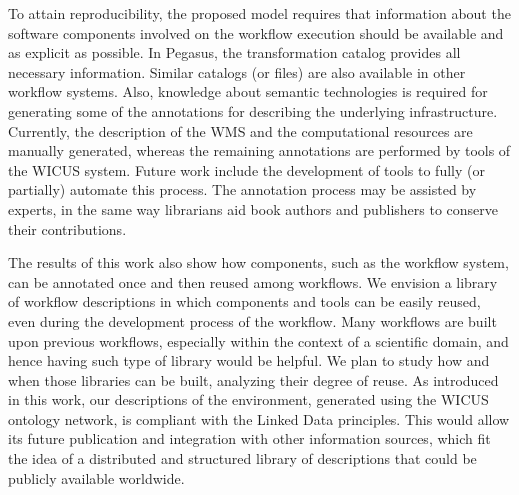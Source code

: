 
To attain reproducibility, the proposed model requires that information about
the software components involved on the workflow execution should be available
and as explicit as possible. In Pegasus, the transformation catalog provides 
all necessary information. Similar catalogs (or files) are also available in other
workflow systems. 
Also, knowledge about semantic technologies is required for generating 
some of the annotations for describing the underlying infrastructure. Currently,
the description of the WMS and the computational resources are manually 
generated, whereas the remaining annotations are performed by tools of the 
WICUS system. Future work include the development of tools to fully (or 
partially) automate this process. The annotation process may be assisted 
by experts, in the same way librarians aid book authors and publishers to 
conserve their contributions.

The results of this work also show how components, such as the workflow 
system, can be annotated once and then reused among workflows. We 
envision a library of workflow descriptions in which components and tools 
can be easily reused, even during the development process of the workflow. 
Many workflows are built upon previous workflows, especially within the 
context of a scientific domain, and hence having such type of library would 
be helpful. We plan to study how and when those libraries can be built, 
analyzing their degree of reuse. As introduced in this work, our 
descriptions of the environment, generated using the WICUS ontology 
network, is compliant with the Linked Data principles. This would allow its 
future publication and integration with other information sources, which fit 
the idea of a distributed and structured library of descriptions that could be 
publicly available worldwide.

